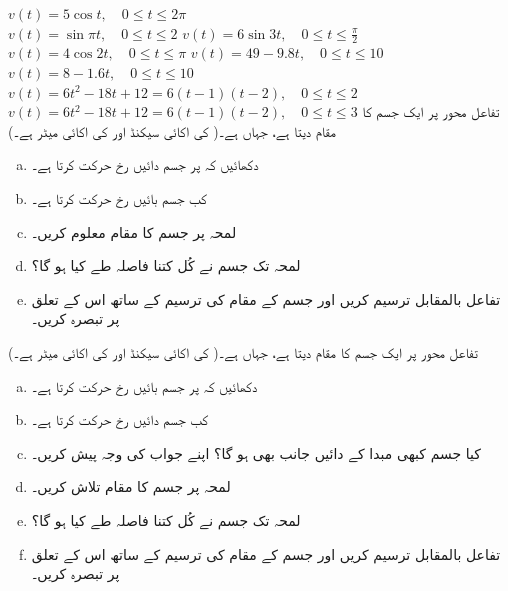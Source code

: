 $v(t)=5\cos t,\quad 0\le t\le 2\pi$\\
$v(t)=\sin \pi t,\quad 0\le t\le 2$
$v(t)=6\sin 3t,\quad 0\le t\le \tfrac{\pi}{2}$\\
$v(t)=4\cos 2t,\quad 0\le t\le \pi$
$v(t)=49-9.8t,\quad 0\le t\le 10$\\
$v(t)=8-1.6t,\quad 0\le t\le 10$
$v(t)=6t^2-18t+12=6(t-1)(t-2),\quad 0\le t\le 2$\\
$v(t)=6t^2-18t+12=6(t-1)(t-2),\quad 0\le t\le 3$
تفاعل  محور  پر ایک جسم کا مقام دیتا ہے، جہاں  ہے۔( کی اکائی سیکنڈ  اور  کی اکائی میٹر  ہے۔)
\begin{enumerate}[a.]
\item
دکھائیں کہ  پر جسم دائیں رخ حرکت کرتا ہے۔
\item
کب جسم بائیں رخ حرکت کرتا ہے۔
\item
لمحہ  پر جسم کا مقام معلوم کریں۔
\item
لمحہ  تک جسم نے کُل کتنا فاصلہ طے کیا ہو گا؟
\item
تفاعل  بالمقابل  ترسیم کریں اور جسم  کے مقام کی ترسیم کے ساتھ  اس کے تعلق پر تبصرہ کریں۔
\end{enumerate}
تفاعل  محور  پر ایک جسم کا مقام دیتا ہے،  جہاں  ہے۔( کی اکائی سیکنڈ  اور  کی اکائی میٹر  ہے۔)
\begin{enumerate}[a.]
\item
دکھائیں کہ  پر جسم بائیں رخ حرکت کرتا ہے۔
\item
کب جسم دائیں رخ حرکت کرتا ہے۔
\item
کیا جسم کبھی  مبدا کے دائیں جانب  بھی ہو گا؟ اپنے جواب کی وجہ پیش کریں۔
\item
لمحہ  پر جسم کا مقام تلاش کریں۔
\item
لمحہ  تک جسم نے کُل کتنا فاصلہ طے کیا ہو گا؟
\item
تفاعل  بالمقابل  ترسیم کریں اور  جسم  کے مقام کی ترسیم کے ساتھ  اس کے تعلق پر تبصرہ کریں۔
\end{enumerate}
